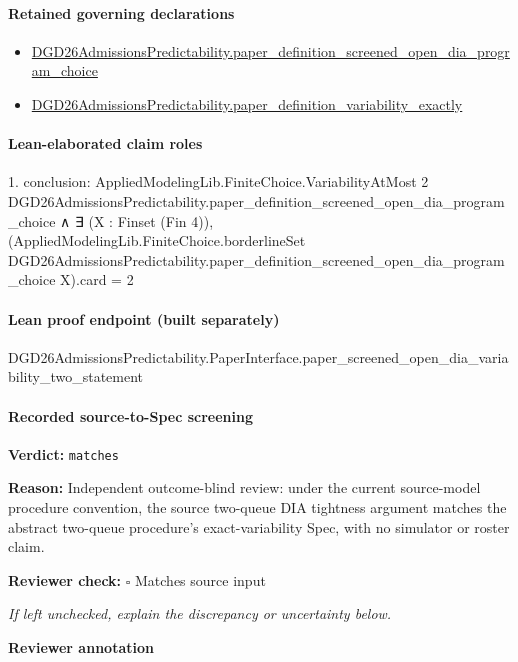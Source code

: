 \documentclass[10pt]{article}
\newcommand{\reviewerbox}{%
  \par\noindent\fbox{\parbox{0.96\linewidth}{\rule{0pt}{0.38in}}}\par
}
\newcommand{\reviewmatch}[1]{%
  \par\noindent\textbf{Reviewer check:} $\square$\; #1\par
  \noindent\emph{If left unchecked, explain the discrepancy or uncertainty below.}\par
}
\begin{document}
\paragraph{Retained governing declarations}
\begin{itemize}\raggedright
\item \hyperlink{governing-declaration-0632e040f3de5b52}{DGD26\allowbreak{}Admissions\allowbreak{}Predictability.\allowbreak{}paper\_\allowbreak{}definition\_\allowbreak{}screened\_\allowbreak{}open\_\allowbreak{}dia\_\allowbreak{}program\_\allowbreak{}choice}
\item \hyperlink{governing-declaration-ce6697be3f1c2256}{DGD26\allowbreak{}Admissions\allowbreak{}Predictability.\allowbreak{}paper\_\allowbreak{}definition\_\allowbreak{}variability\_\allowbreak{}exactly}
\end{itemize}
\paragraph{Lean-elaborated claim roles}\begin{ReviewVerbatim}
1. conclusion: AppliedModelingLib.FiniteChoice.VariabilityAtMost 2
    DGD26AdmissionsPredictability.paper_definition_screened_open_dia_program_choice ∧
  ∃ (X : Finset (Fin 4)),
    (AppliedModelingLib.FiniteChoice.borderlineSet
          DGD26AdmissionsPredictability.paper_definition_screened_open_dia_program_choice X).card =
      2
\end{ReviewVerbatim}

\paragraph{Lean proof endpoint (built separately)}\begin{ReviewVerbatim}
DGD26AdmissionsPredictability.PaperInterface.paper_screened_open_dia_variability_two_statement
\end{ReviewVerbatim}

\paragraph{Recorded source-to-Spec screening}
\textbf{Verdict:} \texttt{matches}
\\
{\raggedright
\textbf{Reason:} Independent outcome-\allowbreak{}blind review:\allowbreak{} under the current source-\allowbreak{}model procedure convention, the source two-\allowbreak{}queue DIA tightness argument matches the abstract two-\allowbreak{}queue procedure's exact-\allowbreak{}variability Spec, with no simulator or roster claim.\allowbreak{}
\par}
\reviewmatch{Matches source input}
\noindent\textbf{Reviewer annotation}\par
\reviewerbox
\clearpage
\hypertarget{source-claim-68c8be83630deedf}{}
\end{document}
